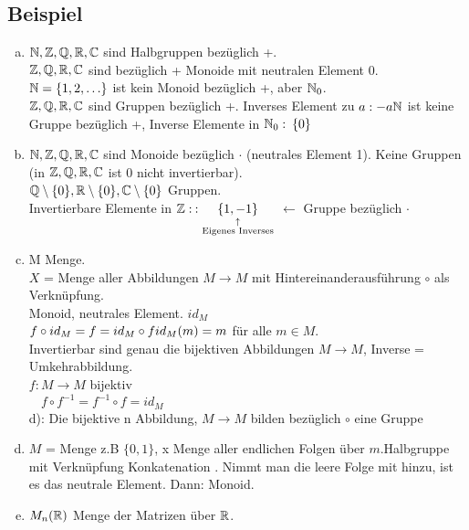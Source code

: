\subsection{Beispiel}\label{sec:1.6}
\begin{enumerate}[a)]
\item $\mathbb{N},\mathbb{Z},\mathbb{Q},\mathbb{R},\mathbb{C}$ sind Halbgruppen bezüglich +.\\
$\mathbb{Z},\mathbb{Q},\mathbb{R},\mathbb{C}$ sind bezüglich + Monoide mit neutralen Element 0.\\
$\mathbb{N} = \{ 1,2,\ldots \}$ ist kein Monoid bezüglich +, aber $\mathbb{N}_0$.\\
$\mathbb{Z},\mathbb{Q},\mathbb{R},\mathbb{C}$ sind Gruppen bezüglich +. Inverses Element zu $a : -a\\
\mathbb{N}$ ist keine Gruppe bezüglich +, Inverse Elemente in $\mathbb{N}_0:\: \{0\}$
\item $\mathbb{N},\mathbb{Z},\mathbb{Q},\mathbb{R},\mathbb{C}$ sind Monoide bezüglich $\cdot$ (neutrales Element 1). Keine Gruppen (in $\mathbb{Z}, \mathbb{Q},\mathbb{R},\mathbb{C}$ ist 0 nicht invertierbar).\\
$\mathbb{Q}\setminus\{0\},\mathbb{R} \setminus \{0\}, \mathbb{C} \setminus \{0\}$ Gruppen.\\
Invertierbare Elemente in $\mathbb{Z}:\:: \underset{\substack{\uparrow\\\text{Eigenes Inverses}}}{\{1,-1\}}$ $\leftarrow$ Gruppe bezüglich $\cdot$
\item M Menge.\\
$X$ = Menge aller Abbildungen $M \longrightarrow M$ mit Hintereinanderausführung $\circ$ als Verknüpfung.\\
Monoid, neutrales Element. $id_M$\\
$f \circ id_M = f = id_M \circ f\\
id_M(m) = m$ für alle $m \in M$.\\
Invertierbar sind genau die bijektiven Abbildungen $M \longrightarrow M$, Inverse = Umkehrabbildung.\\
$f : M \longrightarrow M$ bijektiv\\
$\phantom{f : }f \circ f^{-1} = f^{-1} \circ f = id_M$\\
 d): Die bijektive n Abbildung, $ M \longrightarrow M$ bilden bezüglich $\circ$ eine Gruppe	
\item $M$ = Menge z.B $\{0,1\}$, x Menge aller endlichen Folgen über $m$.Halbgruppe mit Verknüpfung Konkatenation . Nimmt man die leere Folge mit hinzu, ist es das neutrale Element. Dann: Monoid.
\item $M_n(\mathbb{R})$ Menge der Matrizen über $\mathbb{R}$.\\

\end{enumerate}

